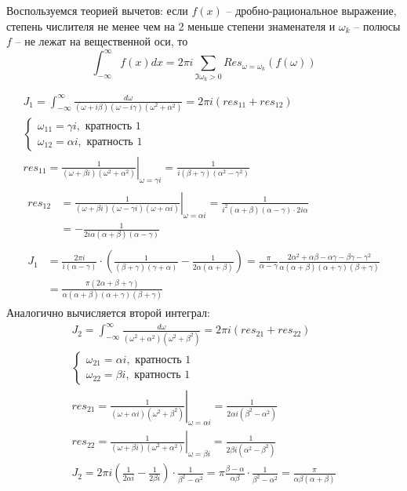 \documentclass[a4paper,14pt]{extarticle}
\begin{document}
Воспользуемся теорией вычетов: если $f(x)$ -- дробно-рациональное выражение, степень числителя не менее чем на 2 меньше степени знаменателя и $\omega_k$ -- полюсы $f$ -- не лежат на вещественной оси, то
\[ \int_{-\infty}^\infty f(x)dx = 2\pi i \sum_{\Im \omega_k > 0} Res_{\omega=\omega_k}(f(\omega)) \]

\begin{gather*}
    J_1 = \int_{-\infty}^\infty \frac{d\omega}{(\omega + i\beta)(\omega-i\gamma)(\omega^2+\alpha^2)} = 2\pi i (res_{11} + res_{12}) \\
    \begin{cases}
        \omega_{11} = \gamma i, \text{ кратность } 1 \\
        \omega_{12} = \alpha i, \text{ кратность } 1
    \end{cases} \\
    res_{11} = \left.\frac{1}{(\omega + \beta i)(\omega^2+\alpha^2)}\right|_{\omega=\gamma i} = \frac{1}{i(\beta+\gamma)(\alpha^2-\gamma^2)} \\
    \begin{aligned}
        res_{12} &= \left.\frac{1}{(\omega+\beta i)(\omega-\gamma i)(\omega+\alpha i)}\right|_{\omega=\alpha i} = \frac{1}{i^2 (\alpha+\beta)(\alpha-\gamma) \cdot 2 i \alpha} \\
        &= -\frac{1}{2i\alpha(\alpha+\beta)(\alpha-\gamma)}
    \end{aligned} \\
    \begin{aligned}
        J_1 &= \frac{2\pi i}{i(\alpha-\gamma)} \cdot \left( \frac{1}{(\beta + \gamma)(\gamma+\alpha)} - \frac{1}{2\alpha(\alpha+\beta)} \right) = \frac{\pi}{\alpha-\gamma}\frac{2\alpha^2+\alpha\beta - \alpha\gamma-\beta\gamma-\gamma^2}{\alpha(\alpha+\beta)(\alpha+\gamma)(\beta+\gamma)} \\
        &= \frac{\pi(2\alpha + \beta + \gamma)}{\alpha(\alpha+\beta)(\alpha+\gamma)(\beta+\gamma)}
    \end{aligned}
\end{gather*}
Аналогично вычисляется второй интеграл:
\begin{gather*}
    J_2 = \int_{-\infty}^\infty \frac{d\omega}{(\omega^2 + \alpha^2)(\omega^2+\beta^2)} = 2\pi i (res_{21} + res_{22}) \\
    \begin{cases}
        \omega_{21} = \alpha i, \text{ кратность } 1 \\
        \omega_{22} = \beta i, \text{ кратность } 1
    \end{cases} \\
    res_{21} = \left.\frac{1}{(\omega + \alpha i)(\omega^2+\beta^2)}\right|_{\omega=\alpha i} = \frac{1}{2\alpha i (\beta^2-\alpha^2)} \\
    res_{22} = \left.\frac{1}{(\omega+\beta i)(\omega^2+\alpha^2)}\right|_{\omega=\beta i} = \frac{1}{2\beta i (\alpha^2-\beta^2)} \\
    J_2 = 2\pi i \left( \frac{1}{2\alpha i} - \frac{1}{2\beta i} \right) \cdot \frac{1}{\beta^2-\alpha^2} = \pi \frac{\beta-\alpha}{\alpha\beta} \cdot \frac{1}{\beta^2-\alpha^2} = \frac{\pi}{\alpha\beta(\alpha+\beta)}
\end{gather*}
\end{document}

